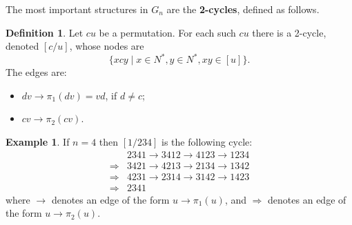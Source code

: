 \documentclass[a4paper]{article}
\theoremstyle{definition}
\newtheorem{defn}{Definition}[section]
\newtheorem{example}{Example}[section]
\theoremstyle{remark}
\let\definiendum\textbf
\begin{document}
The most important structures in $G_n$ are the \definiendum{2-cycles}, defined as follows.
\begin{defn}
    Let $cu$ be a permutation. For each such $cu$ there is a 2-cycle, denoted $[c/u]$, whose nodes are
    \[
        \{ xcy \;|\; x\in N^*, y\in N^*, xy \in [u] \}.
    \]
    The edges are:
    \begin{itemize}
        \item $dv\to\pi_1(dv) = vd$, if $d\ne c$;
        \item $cv\to\pi_2(cv)$.
    \end{itemize}
\end{defn}
\let\To\Rightarrow
\begin{example}
    If $n=4$ then $[1/234]$ is the following cycle:
    \begin{align*}
        &2341 \to 3412 \to 4123 \to 1234\\
        \To{} &3421 \to 4213 \to 2134 \to 1342\\
        \To{} &4231 \to 2314 \to 3142 \to 1423\\
        \To{} &2341
    \end{align*}
    where $\to$ denotes an edge of the form $u\to\pi_1(u)$, and $\To$ denotes an edge of the form $u\to\pi_2(u)$.
\end{example}
\end{document}
